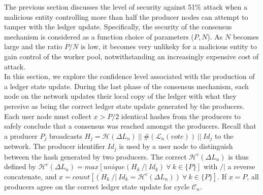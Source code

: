 The previous section discusses the level of security against 51\% attack when a malicious entity controlling more than half the producer nodes can attempt to tamper with the ledger update. Specifically, the security of the consensus mechanism is considered as a function choice of parameters ($P,N$). As $N$ becomes large and the ratio $P/N$ is low, it becomes very unlikeky for a malicious entity to gain control of the worker pool, notwithstanding an increasingly expensive cost of attack. \\

In this section, we explore the confidence level associated with the production of a ledger state update. During the last phase of the consensus mechanism, each node on the network updates their local copy of the ledger with what they perceive as being the correct ledger state update generated by the producers. Each user node must collect $x > P/2$ identical hashes from the producers to safely conclude that a consensus was reached amongst the producers. Recall that a producer $P_j$ broadcasts $H_{j} = \mathcal{H}(\Delta L_n)~||~\#(\mathcal{L}_{n}(vote))~||~Id_j$ to the network. The producer identifier $Id_j$ is used by a user node to distinguish between the hash generated by two producers. The correct $\mathcal{H}^c(\Delta L_n)$ is thus defined by $\mathcal{H}^c(\Delta L_n) = max[unique(H_k~/|~Id_k)~\forall~k\in\{P\}]$ with $/|$ a reverse concatenate, and $x = count[(H_k~/|~ Id_k= \mathcal{H}^c(\Delta L_n))~\forall~k\in\{P\}]$. If $x=P$, all producers agree on the correct ledger state update for cycle $\mathcal{C}_n$. \\

